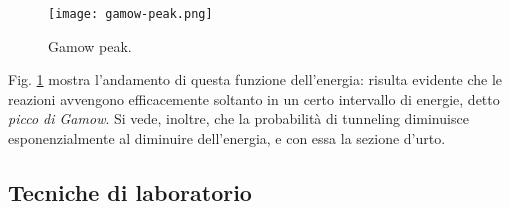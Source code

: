 \begin{figure}
	\centering
	\texttt{[image: gamow-peak.png]}
	\caption{Gamow peak.}
	\label{gamow-peak}
\end{figure}

Fig. \ref{gamow-peak} mostra l'andamento di questa funzione dell'energia: risulta evidente che le reazioni avvengono efficacemente soltanto in un certo intervallo di energie, detto \textit{picco di Gamow}. Si vede, inoltre, che la probabilità di tunneling diminuisce esponenzialmente al diminuire dell'energia, e con essa la sezione d'urto.

\subsection{Tecniche di laboratorio}

